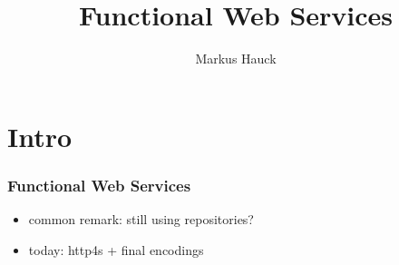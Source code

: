 \documentclass{beamer}
\author{Markus Hauck}
\institute{codecentric AG}
\title{Functional Web Services}
\begin{document}
{
  \begin{frame}
    \titlepage{}
  \end{frame}
}

\begin{frame}
  \tableofcontents
\end{frame}

\section{Intro}

\begin{frame}
  \frametitle{Functional Web Services}
  \begin{itemize}
  \item common remark: still using repositories?
  \item today: http4s + final encodings
  \end{itemize}
\end{frame}
\end{document}
